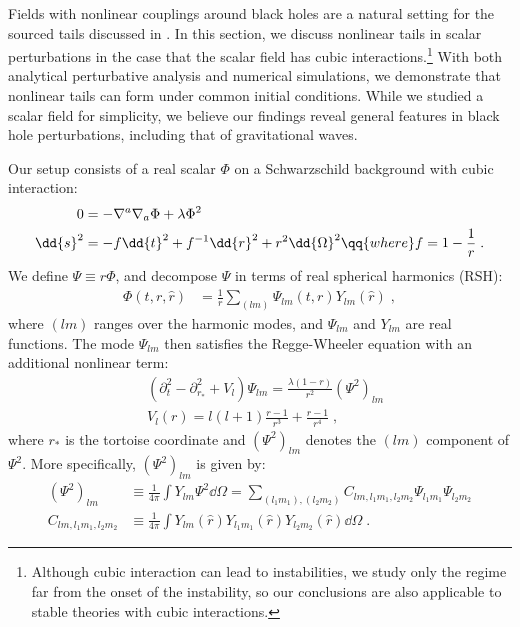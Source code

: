 \label{sec:self_interacting_scalar_field}
Fields with nonlinear couplings around black holes are a natural setting for the sourced tails discussed in .
In this section, we discuss nonlinear tails in scalar perturbations in the case that the scalar field has cubic interactions.\footnote{Although cubic interaction can lead to instabilities, we study only the regime far from the onset of the instability, so our conclusions are also applicable to stable theories with cubic interactions.}
With both analytical perturbative analysis and numerical simulations, we demonstrate that nonlinear tails can form under common initial conditions.
While we studied a scalar field for simplicity, we believe our findings reveal general features in black hole perturbations, including that of gravitational waves.


\label{sec:coupled_simulation_setup}

Our setup consists of a real scalar $\Phi$ on a Schwarzschild background with cubic interaction:
\begin{align}
  \label{eq:cubic_scalar_Phi_eqn}
  0 &= -\nabla^a \nabla_a \Phi + \lambda \Phi^2 \nonumber \\
  \dd{s}^2 &= -f \dd{t}^2 + f^{-1} \dd{r}^2 + r^2 \dd{\Omega}^2 \qq{where} f = 1 - \frac{1}{r} \;.
\end{align}
We define $\Psi \equiv r \Phi$, and decompose $\Psi$ in terms of real spherical harmonics (RSH):
\begin{align}
  \Phi(t, r, \hat{r}) &= \frac{1}{r} \sum_{(lm)} \Psi_{lm}(t, r) Y_{lm}(\hat{r}) \;,
\end{align}
where $(lm)$ ranges over the harmonic modes, and $\Psi_{lm}$ and $Y_{lm}$ are real functions.
The mode $\Psi_{lm}$ then satisfies the Regge-Wheeler equation with an additional nonlinear term:
\begin{align}
  \label{eq:cubic_scalar_Psi_lm_eqn}
  & (\partial_t^2 -  \partial_{r_*}^2 + V_l) \Psi_{lm}
    =  \frac{\lambda(1-r)}{r^2} (\Psi^2)_{lm} \nonumber \\
  & V_l(r) =  l (l+1) \frac{r-1}{r^3} + \frac{r-1}{r^4} \;,
\end{align}
where $r_*$ is the tortoise coordinate and $(\Psi^2)_{lm}$ denotes the $(lm)$ component of $\Psi^2$.
More specifically, $(\Psi^2)_{lm}$ is given by:
\begin{align}
  (\Psi^2)_{lm} &\equiv \frac{1}{4\pi} \int Y_{lm} \Psi^2 \dd{\Omega} = \sum_{(l_1 m_1), (l_2 m_2)} C_{lm,l_1 m_1,l_2 m_2} \Psi_{l_1 m_1} \Psi_{l_2 m_2} \nonumber \\
  C_{lm,l_1 m_1,l_2 m_2} &\equiv \frac{1}{4\pi} \int Y_{lm}(\hat{r}) Y_{l_1 m_1}(\hat{r}) Y_{l_2 m_2}(\hat{r}) \dd{\Omega} \;.
\end{align}


